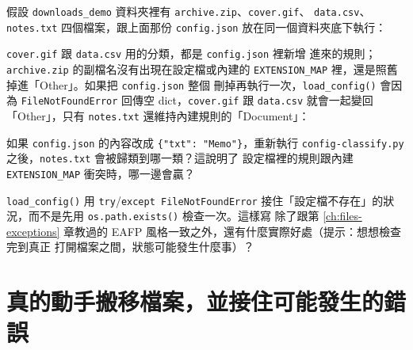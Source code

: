 假設 \texttt{downloads\_demo} 資料夾裡有 \texttt{archive.zip}、\texttt{cover.gif}、
\texttt{data.csv}、\texttt{notes.txt} 四個檔案，跟上面那份 \texttt{config.json}
放在同一個資料夾底下執行：


\texttt{cover.gif} 跟 \texttt{data.csv} 用的分類，都是 \texttt{config.json} 裡新增
進來的規則；\texttt{archive.zip} 的副檔名沒有出現在設定檔或內建的
\texttt{EXTENSION\_MAP} 裡，還是照舊掉進「Other」。如果把 \texttt{config.json} 整個
刪掉再執行一次，\texttt{load\_config()} 會因為 \texttt{FileNotFoundError} 回傳空
dict，\texttt{cover.gif} 跟 \texttt{data.csv} 就會一起變回「Other」，只有
\texttt{notes.txt} 還維持內建規則的「Document」：



\begin{drills}[label=drills:config-file]
\item 如果 \texttt{config.json} 的內容改成 \texttt{\{"txt": "Memo"\}}，重新執行
\texttt{config-classify.py} 之後，\texttt{notes.txt} 會被歸類到哪一類？這說明了
設定檔裡的規則跟內建 \texttt{EXTENSION\_MAP} 衝突時，哪一邊會贏？
\item \texttt{load\_config()} 用 \texttt{try}/\texttt{except FileNotFoundError}
接住「設定檔不存在」的狀況，而不是先用 \texttt{os.path.exists()} 檢查一次。這樣寫
除了跟第 \ref{ch:files-exceptions} 章教過的 EAFP 風格一致之外，還有什麼實際好處（提示：想想檢查完到真正
打開檔案之間，狀態可能發生什麼事）？
\end{drills}

\section{真的動手搬移檔案，並接住可能發生的錯誤}
\label{sec:move-files}

